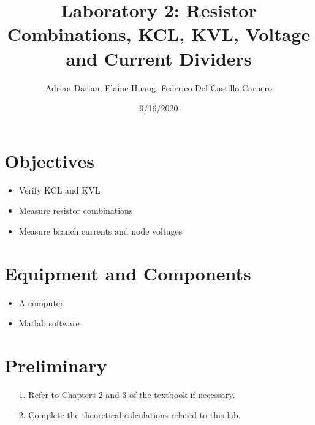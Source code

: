 \documentclass[a4paper]{article}
\title{Laboratory 2: Resistor Combinations, KCL, KVL, Voltage and Current Dividers}
\author{Adrian Darian, Elaine Huang, Federico Del Castillo Carnero}
\date{9/16/2020}
\begin{document}
  
\maketitle
  
\section*{Objectives}
\begin{itemize}
	\item Verify KCL and KVL
	\item Measure resistor combinations
	\item Measure branch currents and node voltages
\end{itemize}

\section*{Equipment and Components}
\begin{itemize}
	\item A computer
	\item Matlab software
\end{itemize}

\section*{Preliminary}
\begin{itemize}
	\item[1.] Refer to Chapters 2 and 3 of the textbook if necessary.
	\item[2.] Complete the theoretical calculations related to this lab. 
\end{itemize}
\end{document}
